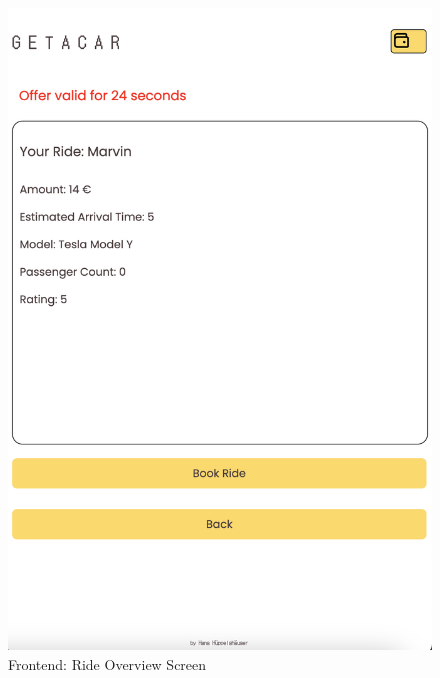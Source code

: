 \begin{figure}[h]
    \centering
    
    \begin{minipage}{0.45\linewidth}
        \centering
        \includegraphics[width=\linewidth]{data/ffss/5.png}
        \caption{Frontend: Ride Overview Screen}
        \label{fig:FWS1}
    \end{minipage}
    \hfill
    \begin{minipage}{0.45\linewidth}
        \centering

\end{minipage}
\end{figure}
